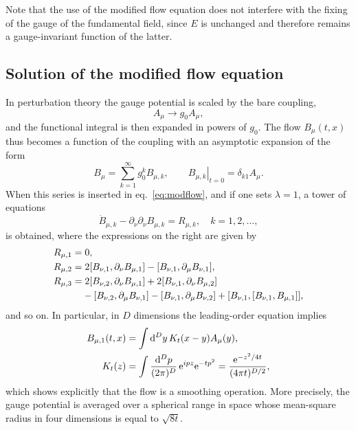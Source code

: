 Note that the use of the modified flow equation does not interfere
with the fixing of the gauge of the fundamental field, since
$E$ is unchanged and therefore remains a gauge-invariant
function of the latter.


\subsection{Solution of the modified flow equation}

In perturbation theory the gauge potential is scaled by the
bare coupling,
\begin{equation}
  A_{\mu}\to g_0A_{\mu},
\end{equation}
and the functional integral is then expanded in powers of $g_0$.
The flow $B_{\mu}(t,x)$ thus becomes a function
of the coupling with an asymptotic expansion of the form
\begin{equation}
  B_{\mu}=\sum_{k=1}^{\infty}g_0^kB_{\mu,k},
  \qquad
  \left.B_{\mu,k}\right|_{t=0}=\delta_{k1}A_{\mu}.
  \label{eq:Bseries}
\end{equation}
When this series is inserted in eq.~\eqref{eq:modflow},
and if one sets $\lambda=1$,
a tower of equations
\begin{equation}
  \dot{B}_{\mu,k}-\partial_{\nu}\partial_{\nu}B_{\mu,k}=
  R_{\mu,k},
  \quad k=1,2,\ldots,
  \label{eq:tower}
\end{equation}
is obtained, where the expressions on the right are given by
\begin{align}
  R_{\mu,1}&=0,
  \\
  R_{\mu,2}&=2[B_{\nu,1},\partial_{\nu}B_{\mu,1}]
            -[B_{\nu,1},\partial_{\mu}B_{\nu,1}],
  \\
  R_{\mu,3}&=2[B_{\nu,2},\partial_{\nu}B_{\mu,1}]
            +2[B_{\nu,1},\partial_{\nu}B_{\mu,2}]
            \nonumber\\
  &\hphantom{{}=}
            -[B_{\nu,2},\partial_{\mu}B_{\nu,1}]
            -[B_{\nu,1},\partial_{\mu}B_{\nu,2}]
            +[B_{\nu,1},[B_{\nu,1},B_{\mu,1}]],
\end{align}
and so on. In particular, in $D$ dimensions
the leading-order equation implies
\begin{align}
  B_{\mu,1}(t,x)&=\int\mathrm{d}^Dy\,K_t(x-y)A_{\mu}(y),
  \label{eq:B1ker}\\
  K_t(z)&=\int{\mathrm{d}^Dp\over(2\pi)^D}\,\mathrm{e}^{ipz}\mathrm{e}^{-tp^2}=
  {\mathrm{e}^{-z^2/4t}\over(4\pi t)^{D/2}},
  \label{eq:Kt}
\end{align}
which shows explicitly that the flow is a smoothing operation.
More precisely, the gauge potential is averaged over a
spherical range in space whose
mean-square radius in four dimensions is
equal to $\sqrt{8t}$.

